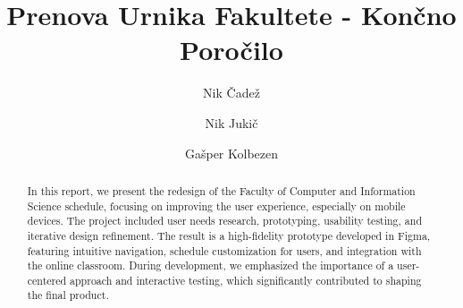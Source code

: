 \documentclass[sigconf,nonacm]{acmart}
\begin{document}
\title{Prenova Urnika Fakultete - Končno Poročilo}

\author{Nik Čadež}

\author{Nik Jukič}

\author{Gašper Kolbezen}

\begin{abstract}
In this report, we present the redesign of the Faculty of Computer and Information Science schedule, focusing on improving the user experience, especially on mobile devices. The project included user needs research, prototyping, usability testing, and iterative design refinement. The result is a high-fidelity prototype developed in Figma, featuring intuitive navigation, schedule customization for users, and integration with the online classroom. During development, we emphasized the importance of a user-centered approach and interactive testing, which significantly contributed to shaping the final product.
\end{abstract}


\maketitle
\end{document}
